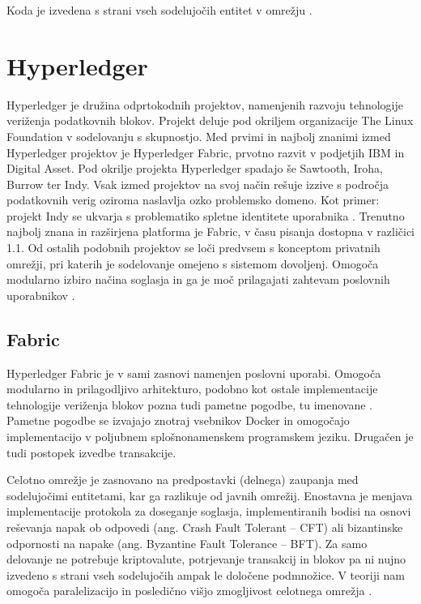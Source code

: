 \documentclass[a4paper, 12pt]{book}
\begin{document}
Koda je izvedena s strani vseh sodelujočih entitet v omrežju \cite{ethereumWhitepaper}.

\section{Hyperledger}
Hyperledger je družina odprtokodnih projektov, namenjenih razvoju tehnologije veriženja podatkovnih blokov.
Projekt deluje pod okriljem organizacije The Linux Foundation v sodelovanju s skupnostjo.
Med prvimi in najbolj znanimi izmed Hyperledger projektov je Hyperledger Fabric, prvotno razvit v podjetjih IBM in Digital Asset.
Pod okrilje projekta Hyperledger spadajo še Sawtooth, Iroha, Burrow ter Indy.
Vsak izmed projektov na svoj način rešuje izzive s področja podatkovnih verig oziroma naslavlja ozko problemsko domeno. Kot primer: projekt Indy se ukvarja s problematiko spletne identitete uporabnika \cite{hyperledgerWeb}.
Trenutno najbolj znana in razširjena platforma je Fabric, v času pisanja dostopna v različici 1.1.
Od ostalih podobnih projektov se loči predvsem s konceptom privatnih omrežji, pri katerih je sodelovanje omejeno s sistemom dovoljenj.
Omogoča modularno izbiro načina soglasja in ga je moč prilagajati zahtevam poslovnih uporabnikov \cite{hyperledgerIbm}.

\subsection{Fabric}
Hyperledger Fabric je v sami zasnovi namenjen poslovni uporabi.
Omogoča modularno in prilagodljivo arhitekturo, podobno kot ostale implementacije tehnologije veriženja blokov pozna tudi pametne pogodbe, tu imenovane .
Pametne pogodbe se izvajajo znotraj vsebnikov Docker in omogočajo implementacijo v poljubnem splošnonamenskem programskem jeziku.
Drugačen je tudi postopek izvedbe transakcije.

Celotno omrežje je zasnovano na predpostavki (delnega) zaupanja med sodelujočimi entitetami, kar ga razlikuje od javnih omrežij.
Enostavna je menjava implementacije protokola za doseganje soglasja, implementiranih bodisi na osnovi reševanja napak ob odpovedi (ang. Crash Fault Tolerant -- CFT) ali bizantinske odpornosti na napake (ang. Byzantine Fault Tolerance -- BFT).
Za samo delovanje ne potrebuje kriptovalute, potrjevanje transakcij in blokov pa ni nujno izvedeno s strani vseh sodelujočih ampak le določene podmnožice.
V teoriji nam omogoča paralelizacijo in posledično višjo zmogljivost celotnega omrežja \cite{hyperledgerDocs}.
\end{document}
